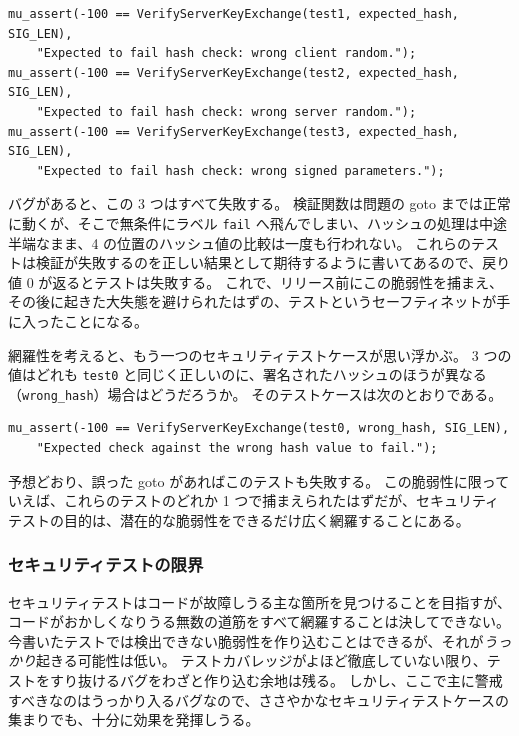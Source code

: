 \documentclass[uplatex]{jsarticle}
\begin{document}
\begin{verbatim}
mu_assert(-100 == VerifyServerKeyExchange(test1, expected_hash, SIG_LEN),
    "Expected to fail hash check: wrong client random.");
mu_assert(-100 == VerifyServerKeyExchange(test2, expected_hash, SIG_LEN),
    "Expected to fail hash check: wrong server random.");
mu_assert(-100 == VerifyServerKeyExchange(test3, expected_hash, SIG_LEN),
    "Expected to fail hash check: wrong signed parameters.");
\end{verbatim}

バグがあると、この 3 つはすべて失敗する。
検証関数は問題の goto までは正常に動くが、そこで無条件にラベル \texttt{fail} へ飛んでしまい、ハッシュの処理は中途半端なまま、4 の位置のハッシュ値の比較は一度も行われない。
これらのテストは検証が失敗するのを正しい結果として期待するように書いてあるので、戻り値 0 が返るとテストは失敗する。
これで、リリース前にこの脆弱性を捕まえ、その後に起きた大失態を避けられたはずの、テストというセーフティネットが手に入ったことになる。

網羅性を考えると、もう一つのセキュリティテストケースが思い浮かぶ。
3 つの値はどれも \texttt{test0} と同じく正しいのに、署名されたハッシュのほうが異なる（\texttt{wrong\_hash}）場合はどうだろうか。
そのテストケースは次のとおりである。

\begin{verbatim}
mu_assert(-100 == VerifyServerKeyExchange(test0, wrong_hash, SIG_LEN),
    "Expected check against the wrong hash value to fail.");
\end{verbatim}

予想どおり、誤った goto があればこのテストも失敗する。
この脆弱性に限っていえば、これらのテストのどれか 1 つで捕まえられたはずだが、セキュリティテストの目的は、潜在的な脆弱性をできるだけ広く網羅することにある。

\subsubsection{セキュリティテストの限界}

セキュリティテストはコードが故障しうる主な箇所を見つけることを目指すが、コードがおかしくなりうる無数の道筋をすべて網羅することは決してできない。
今書いたテストでは検出できない脆弱性を作り込むことはできるが、それが\emph{うっかり}起きる可能性は低い。
テストカバレッジがよほど徹底していない限り、テストをすり抜けるバグをわざと作り込む余地は残る。
しかし、ここで主に警戒すべきなのはうっかり入るバグなので、ささやかなセキュリティテストケースの集まりでも、十分に効果を発揮しうる。
\end{document}
